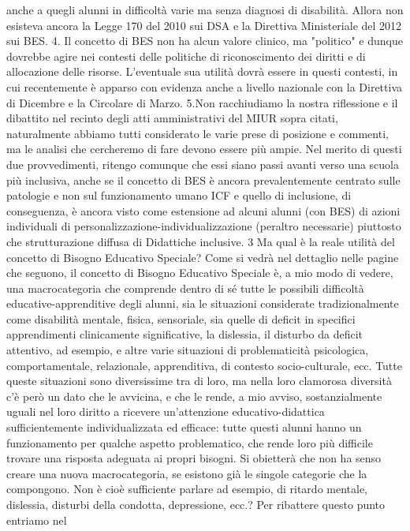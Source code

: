 anche a quegli alunni in difficoltà varie ma senza diagnosi di disabilità. Allora non esisteva ancora la
Legge 170 del 2010 sui DSA e la Direttiva Ministeriale del 2012 sui BES.
4. Il concetto di BES non ha alcun valore clinico, ma "politico" e dunque dovrebbe agire nei
contesti delle politiche di riconoscimento dei diritti e di allocazione delle risorse. L'eventuale sua
utilità dovrà essere in questi contesti, in cui recentemente è apparso con evidenza anche a livello
nazionale con la Direttiva di Dicembre e la Circolare di Marzo.
5.Non racchiudiamo la nostra riflessione e il dibattito nel recinto degli atti amministrativi del
MIUR sopra citati, naturalmente abbiamo tutti considerato le varie prese di posizione e commenti,
ma le analisi che cercheremo di fare devono essere più ampie. Nel merito di questi due
provvedimenti, ritengo comunque che essi siano passi avanti verso una scuola più inclusiva, anche
se il concetto di BES è ancora prevalentemente centrato sulle patologie e non sul funzionamento
umano ICF e quello di inclusione, di conseguenza, è ancora visto come estensione ad alcuni alunni
(con BES) di azioni individuali di personalizzazione-individualizzazione (peraltro necessarie)
piuttosto che strutturazione diffusa di Didattiche inclusive.
3
Ma qual è la reale utilità del concetto di Bisogno Educativo Speciale?
Come si vedrà nel dettaglio nelle pagine che seguono, il concetto di Bisogno Educativo
Speciale è, a mio modo di vedere, una macrocategoria che comprende dentro di sé tutte le
possibili  difficoltà  educative-apprenditive  degli  alunni,  sia  le  situazioni  considerate
tradizionalmente come disabilità mentale, fisica, sensoriale, sia quelle di deficit in specifici
apprendimenti clinicamente significative, la dislessia, il disturbo da deficit attentivo, ad esempio, e
altre varie situazioni di problematicità psicologica, comportamentale, relazionale, apprenditiva, di
contesto socio-culturale, ecc.
Tutte queste situazioni sono diversissime tra di loro, ma nella loro clamorosa diversità c’è però
un dato che le avvicina, e che le rende, a mio avviso, sostanzialmente uguali nel loro diritto a
ricevere un’attenzione educativo-didattica sufficientemente individualizzata ed efficace: tutte
questi alunni hanno un funzionamento per qualche aspetto problematico, che rende loro più
difficile trovare una risposta adeguata ai propri bisogni.
Si obietterà che non ha senso creare una nuova macrocategoria, se esistono già le singole
categorie che la compongono. Non è cioè sufficiente parlare ad esempio, di ritardo mentale,
dislessia, disturbi della condotta, depressione, ecc.? Per ribattere questo punto entriamo nel
